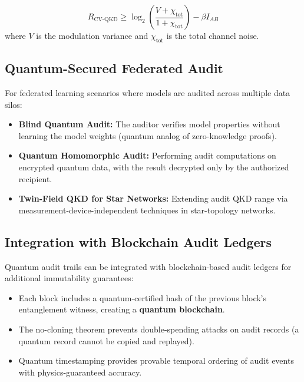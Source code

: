 \documentclass[11pt,a4paper]{article}
\theoremstyle{plain}
\theoremstyle{definition}
\theoremstyle{remark}
\begin{document}
\[
R_{\text{CV-QKD}} \geq \log_2\left(\frac{V + \chi_{\text{tot}}}
{1 + \chi_{\text{tot}}}\right) - \beta I_{AB}
\]
where $V$ is the modulation variance and $\chi_{\text{tot}}$ is the
total channel noise.

\subsection{Quantum-Secured Federated Audit}
\label{sec:federated}

For federated learning scenarios where models are audited across
multiple data silos:

\begin{itemize}
  \item \textbf{Blind Quantum Audit:} The auditor verifies model
        properties without learning the model weights (quantum analog
        of zero-knowledge proofs).
  \item \textbf{Quantum Homomorphic Audit:} Performing audit computations
        on encrypted quantum data, with the result decrypted only by
        the authorized recipient.
  \item \textbf{Twin-Field QKD for Star Networks:} Extending audit
        QKD range via measurement-device-independent techniques in
        star-topology networks.
\end{itemize}

\subsection{Integration with Blockchain Audit Ledgers}
\label{sec:blockchain}

Quantum audit trails can be integrated with blockchain-based audit
ledgers for additional immutability guarantees:

\begin{itemize}
  \item Each block includes a quantum-certified hash of the previous
        block's entanglement witness, creating a \textbf{quantum blockchain}.
  \item The no-cloning theorem prevents double-spending attacks on audit
        records (a quantum record cannot be copied and replayed).
  \item Quantum timestamping provides provable temporal ordering of
        audit events with physics-guaranteed accuracy.
\end{itemize}

\end{document}
